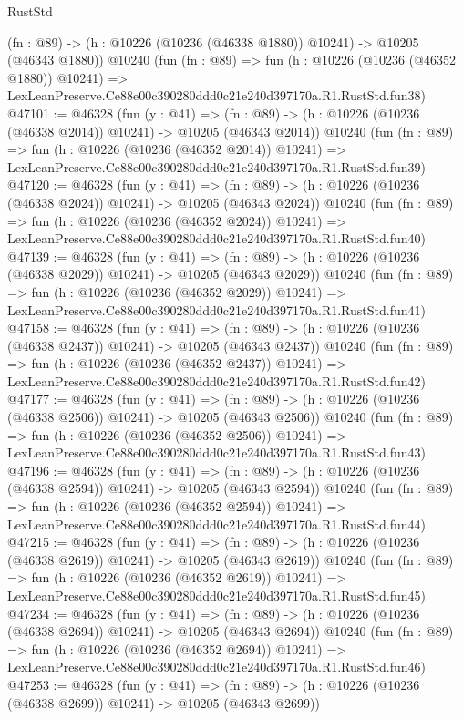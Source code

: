 \begin{lexlean}{RustStd}
\begin{coremodule}
    (fn : @89) -> (h : @10226 (@10236 (@46338 @1880)) @10241) -> @10205 (@46343 @1880))
    @10240
    (fun (fn : @89) =>
    fun (h : @10226 (@10236 (@46352 @1880)) @10241) =>
    LexLeanPreserve.Ce88e00c390280ddd0c21e240d397170a.R1.RustStd.fun38)
@47101 := @46328
    (fun (y : @41) =>
    (fn : @89) -> (h : @10226 (@10236 (@46338 @2014)) @10241) -> @10205 (@46343 @2014))
    @10240
    (fun (fn : @89) =>
    fun (h : @10226 (@10236 (@46352 @2014)) @10241) =>
    LexLeanPreserve.Ce88e00c390280ddd0c21e240d397170a.R1.RustStd.fun39)
@47120 := @46328
    (fun (y : @41) =>
    (fn : @89) -> (h : @10226 (@10236 (@46338 @2024)) @10241) -> @10205 (@46343 @2024))
    @10240
    (fun (fn : @89) =>
    fun (h : @10226 (@10236 (@46352 @2024)) @10241) =>
    LexLeanPreserve.Ce88e00c390280ddd0c21e240d397170a.R1.RustStd.fun40)
@47139 := @46328
    (fun (y : @41) =>
    (fn : @89) -> (h : @10226 (@10236 (@46338 @2029)) @10241) -> @10205 (@46343 @2029))
    @10240
    (fun (fn : @89) =>
    fun (h : @10226 (@10236 (@46352 @2029)) @10241) =>
    LexLeanPreserve.Ce88e00c390280ddd0c21e240d397170a.R1.RustStd.fun41)
@47158 := @46328
    (fun (y : @41) =>
    (fn : @89) -> (h : @10226 (@10236 (@46338 @2437)) @10241) -> @10205 (@46343 @2437))
    @10240
    (fun (fn : @89) =>
    fun (h : @10226 (@10236 (@46352 @2437)) @10241) =>
    LexLeanPreserve.Ce88e00c390280ddd0c21e240d397170a.R1.RustStd.fun42)
@47177 := @46328
    (fun (y : @41) =>
    (fn : @89) -> (h : @10226 (@10236 (@46338 @2506)) @10241) -> @10205 (@46343 @2506))
    @10240
    (fun (fn : @89) =>
    fun (h : @10226 (@10236 (@46352 @2506)) @10241) =>
    LexLeanPreserve.Ce88e00c390280ddd0c21e240d397170a.R1.RustStd.fun43)
@47196 := @46328
    (fun (y : @41) =>
    (fn : @89) -> (h : @10226 (@10236 (@46338 @2594)) @10241) -> @10205 (@46343 @2594))
    @10240
    (fun (fn : @89) =>
    fun (h : @10226 (@10236 (@46352 @2594)) @10241) =>
    LexLeanPreserve.Ce88e00c390280ddd0c21e240d397170a.R1.RustStd.fun44)
@47215 := @46328
    (fun (y : @41) =>
    (fn : @89) -> (h : @10226 (@10236 (@46338 @2619)) @10241) -> @10205 (@46343 @2619))
    @10240
    (fun (fn : @89) =>
    fun (h : @10226 (@10236 (@46352 @2619)) @10241) =>
    LexLeanPreserve.Ce88e00c390280ddd0c21e240d397170a.R1.RustStd.fun45)
@47234 := @46328
    (fun (y : @41) =>
    (fn : @89) -> (h : @10226 (@10236 (@46338 @2694)) @10241) -> @10205 (@46343 @2694))
    @10240
    (fun (fn : @89) =>
    fun (h : @10226 (@10236 (@46352 @2694)) @10241) =>
    LexLeanPreserve.Ce88e00c390280ddd0c21e240d397170a.R1.RustStd.fun46)
@47253 := @46328
    (fun (y : @41) =>
    (fn : @89) -> (h : @10226 (@10236 (@46338 @2699)) @10241) -> @10205 (@46343 @2699))

\end{coremodule}
\end{lexlean}
